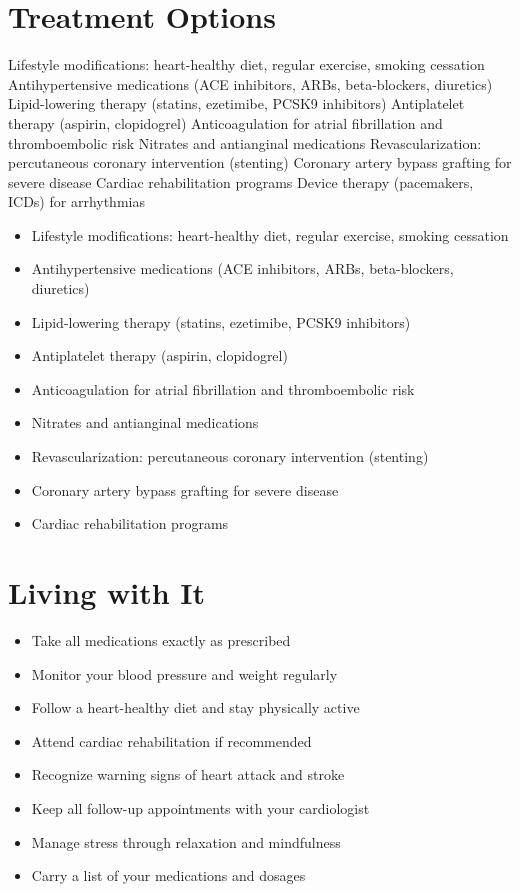 \section{Treatment Options}
Lifestyle modifications: heart-healthy diet, regular exercise, smoking cessation Antihypertensive medications (ACE inhibitors, ARBs, beta-blockers, diuretics) Lipid-lowering therapy (statins, ezetimibe, PCSK9 inhibitors) Antiplatelet therapy (aspirin, clopidogrel) Anticoagulation for atrial fibrillation and thromboembolic risk Nitrates and antianginal medications Revascularization: percutaneous coronary intervention (stenting) Coronary artery bypass grafting for severe disease Cardiac rehabilitation programs Device therapy (pacemakers, ICDs) for arrhythmias

\begin{itemize}[noitemsep]
  \item Lifestyle modifications: heart-healthy diet, regular exercise, smoking cessation
  \item Antihypertensive medications (ACE inhibitors, ARBs, beta-blockers, diuretics)
  \item Lipid-lowering therapy (statins, ezetimibe, PCSK9 inhibitors)
  \item Antiplatelet therapy (aspirin, clopidogrel)
  \item Anticoagulation for atrial fibrillation and thromboembolic risk
  \item Nitrates and antianginal medications
  \item Revascularization: percutaneous coronary intervention (stenting)
  \item Coronary artery bypass grafting for severe disease
  \item Cardiac rehabilitation programs
\end{itemize}
\section{Living with It}
\begin{itemize}[noitemsep]
  \item Take all medications exactly as prescribed
  \item Monitor your blood pressure and weight regularly
  \item Follow a heart-healthy diet and stay physically active
  \item Attend cardiac rehabilitation if recommended
  \item Recognize warning signs of heart attack and stroke
  \item Keep all follow-up appointments with your cardiologist
  \item Manage stress through relaxation and mindfulness
  \item Carry a list of your medications and dosages
\end{itemize}
